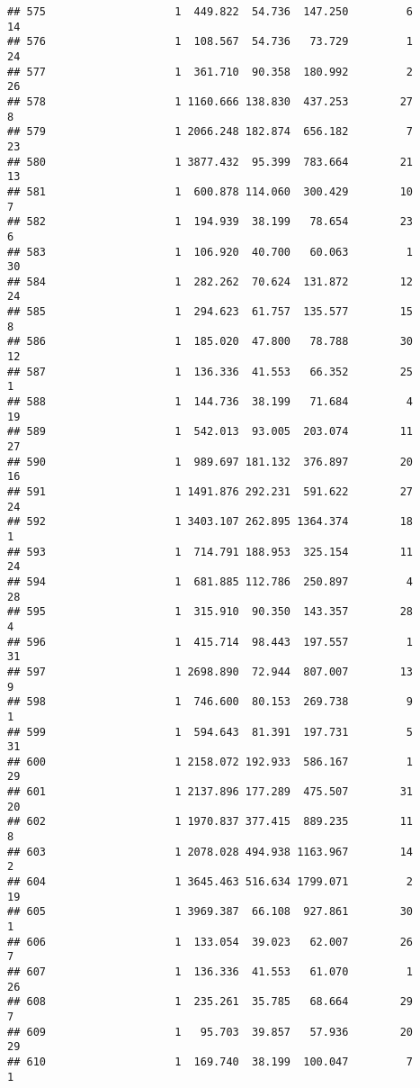 \documentclass[
]{article}
\begin{document}
\begin{verbatim}
## 575                    1  449.822  54.736  147.250         6        14
## 576                    1  108.567  54.736   73.729         1        24
## 577                    1  361.710  90.358  180.992         2        26
## 578                    1 1160.666 138.830  437.253        27         8
## 579                    1 2066.248 182.874  656.182         7        23
## 580                    1 3877.432  95.399  783.664        21        13
## 581                    1  600.878 114.060  300.429        10         7
## 582                    1  194.939  38.199   78.654        23         6
## 583                    1  106.920  40.700   60.063         1        30
## 584                    1  282.262  70.624  131.872        12        24
## 585                    1  294.623  61.757  135.577        15         8
## 586                    1  185.020  47.800   78.788        30        12
## 587                    1  136.336  41.553   66.352        25         1
## 588                    1  144.736  38.199   71.684         4        19
## 589                    1  542.013  93.005  203.074        11        27
## 590                    1  989.697 181.132  376.897        20        16
## 591                    1 1491.876 292.231  591.622        27        24
## 592                    1 3403.107 262.895 1364.374        18         1
## 593                    1  714.791 188.953  325.154        11        24
## 594                    1  681.885 112.786  250.897         4        28
## 595                    1  315.910  90.350  143.357        28         4
## 596                    1  415.714  98.443  197.557         1        31
## 597                    1 2698.890  72.944  807.007        13         9
## 598                    1  746.600  80.153  269.738         9         1
## 599                    1  594.643  81.391  197.731         5        31
## 600                    1 2158.072 192.933  586.167         1        29
## 601                    1 2137.896 177.289  475.507        31        20
## 602                    1 1970.837 377.415  889.235        11         8
## 603                    1 2078.028 494.938 1163.967        14         2
## 604                    1 3645.463 516.634 1799.071         2        19
## 605                    1 3969.387  66.108  927.861        30         1
## 606                    1  133.054  39.023   62.007        26         7
## 607                    1  136.336  41.553   61.070         1        26
## 608                    1  235.261  35.785   68.664        29         7
## 609                    1   95.703  39.857   57.936        20        29
## 610                    1  169.740  38.199  100.047         7         1

\end{verbatim}
\end{document}
